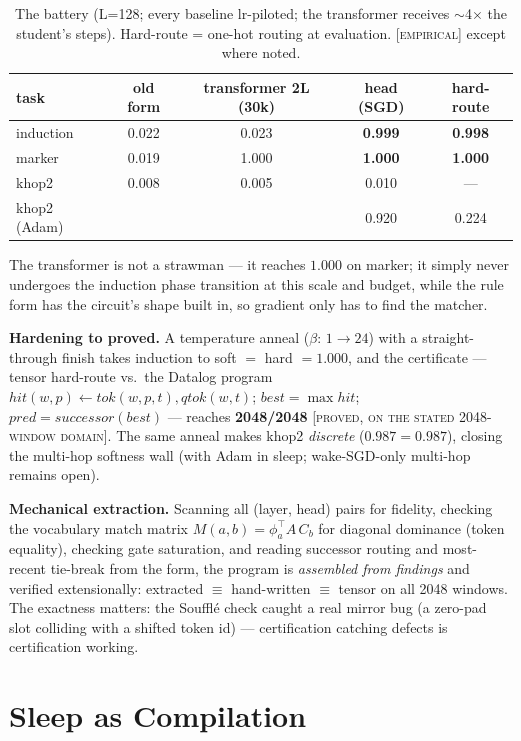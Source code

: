 \documentclass[sigconf,nonacm]{acmart}
\newcommand{\tagp}[1]{\textsc{\small[#1]}}
\begin{document}
\begin{table}[h]
\caption{The battery (L=128; every baseline lr-piloted; the transformer receives $\sim$4$\times$
the student's steps). Hard-route = one-hot routing at evaluation. \tagp{empirical} except where
noted.}
\label{tab:battery}
\small
\begin{tabular}{lcccc}
\toprule
task & old form & transformer 2L (30k) & \textbf{head (SGD)} & hard-route \\
\midrule
induction & 0.022 & 0.023 & \textbf{0.999} & \textbf{0.998} \\
marker & 0.019 & 1.000 & \textbf{1.000} & \textbf{1.000} \\
khop2 & 0.008 & 0.005 & 0.010 & --- \\
khop2 (Adam) & & & 0.920 & 0.224 \\
\bottomrule
\end{tabular}
\end{table}

The transformer is not a strawman --- it reaches $1.000$ on marker; it simply never undergoes the
induction phase transition at this scale and budget, while the rule form has the circuit's shape
built in, so gradient only has to find the matcher.

\textbf{Hardening to proved.} A temperature anneal ($\beta{:}\,1\!\to\!24$) with a
straight-through finish takes induction to soft $=$ hard $= 1.000$, and the certificate ---
tensor hard-route vs.\ the Datalog program
$\mathit{hit}(w,p) \leftarrow \mathit{tok}(w,p,t), \mathit{qtok}(w,t)$;
$\mathit{best} = \max \mathit{hit}$; $\mathit{pred} = \mathit{successor}(\mathit{best})$ ---
reaches \textbf{2048/2048} \tagp{proved, on the stated 2048-window domain}. The same anneal makes
khop2 \emph{discrete} ($0.987 = 0.987$), closing the multi-hop softness wall (with Adam in sleep;
wake-SGD-only multi-hop remains open).

\textbf{Mechanical extraction.} Scanning all (layer, head) pairs for fidelity, checking the
vocabulary match matrix $M(a,b)=\phi_a^\top A\, C_b$ for diagonal dominance (token equality),
checking gate saturation, and reading successor routing and most-recent tie-break from the form,
the program is \emph{assembled from findings} and verified extensionally: extracted $\equiv$
hand-written $\equiv$ tensor on all 2048 windows. The exactness matters: the Souffl\'e check
caught a real mirror bug (a zero-pad slot colliding with a shifted token id) --- certification
catching defects is certification working.

\section{Sleep as Compilation}
\label{sec:compile}
\end{document}
